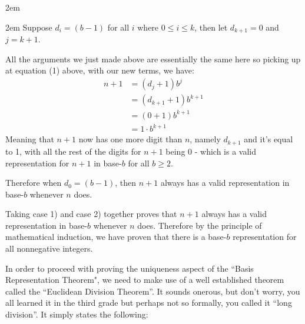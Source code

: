 \documentclass{article}
\newenvironment{jprIn}{\begin{adjustwidth}{2em}{}}{\end{adjustwidth}}
\begin{document}
\begin{jprIn}
\begin{jprIn}
Suppose $d_i=(b-1)$ for all $i$ where $0\le{}i\le{}k$, then let $d_{k+1}=0$ and $j=k+1$.

All the arguments we just made above are essentially the same here so picking up at equation (1) above, with our new terms, we have:
\begin{align*}
n+1 &=(d_j+1)b^j\\
&=(d_{k+1}+1)b^{k+1}\\
&=(0+1)b^{k+1}\\
&=1\cdot{}b^{k+1}
\end{align*}
Meaning that $n+1$ now has one more digit than $n$, namely $d_{k+1}$ and it's equal to 1,
with all the rest of the digits for $n+1$ being 0 - which is a valid representation for $n+1$ in base-$b$ for all $b\ge2$.

Therefore when $d_0=(b-1)$, then $n+1$ always has a valid representation in base-$b$ whenever $n$ does.
\end{jprIn}
Taking case 1) and case 2) together proves that $n+1$ always has a valid representation in base-$b$ whenever $n$ does.
Therefore 
by the principle of mathematical induction,
we have proven that there is a base-$b$ representation for all nonnegative integers.
\end{jprIn}
\bigskip

In order to proceed
with proving the uniqueness aspect of the ``Basis Representation Theorem", we
need to make use of a well established theorem
called the ``Euclidean Division Theorem''.
It sounds onerous, but don't worry, you all learned it
in the third grade but perhaps not so formally, you called it ``long division''. It simply states the following:

\break
\end{document}
